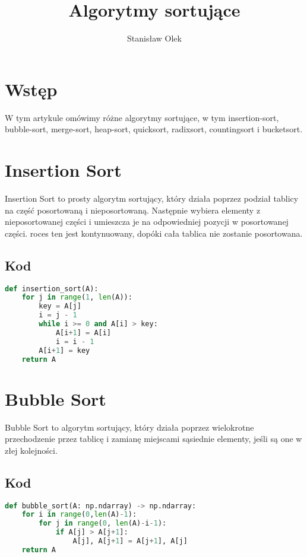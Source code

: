 \documentclass{article}
\title{Algorytmy sortujące}
\author{Stanisław Olek}
\date{}
\begin{document}
\maketitle
\tableofcontents

\section{Wstęp}
W tym artykule omówimy różne algorytmy sortujące, w tym insertion-sort, bubble-sort, merge-sort, heap-sort, quicksort, radixsort, countingsort i bucketsort.

\section{Insertion Sort}
Insertion Sort to prosty algorytm sortujący, który działa poprzez podział tablicy na część posortowaną i nieposortowaną. Następnie wybiera elementy z nieposortowanej części i umieszcza je na odpowiedniej pozycji w posortowanej części. roces ten jest kontynuowany, dopóki cała tablica nie zostanie posortowana.

\subsection{Kod}
\begin{lstlisting}[language=Python]
def insertion_sort(A):
    for j in range(1, len(A)):
        key = A[j]
        i = j - 1
        while i >= 0 and A[i] > key:
            A[i+1] = A[i]
            i = i - 1
        A[i+1] = key
    return A
    \end{lstlisting}

\section{Bubble Sort}
Bubble Sort to algorytm sortujący, który działa poprzez wielokrotne przechodzenie przez tablicę i zamianę miejscami sąsiednie elementy, jeśli są one w złej kolejności.

\subsection{Kod}
\begin{lstlisting}[language=Python]
def bubble_sort(A: np.ndarray) -> np.ndarray:
    for i in range(0,len(A)-1):
        for j in range(0, len(A)-i-1):
            if A[j] > A[j+1]:
                A[j], A[j+1] = A[j+1], A[j]
    return A
\end{lstlisting}
\end{document}

